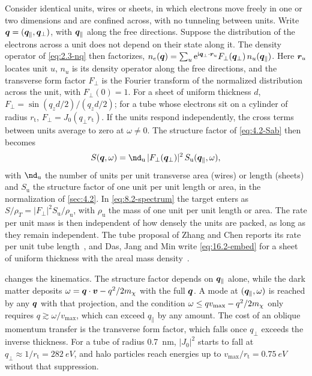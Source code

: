 Consider identical units, wires or sheets, in which electrons move freely in one or two dimensions and are confined across, with no tunneling between units. Write $\bm{q} = (\bm{q}_\parallel, \bm{q}_\perp)$, with $\bm{q}_\parallel$ along the free directions. Suppose the distribution of the electrons across a unit does not depend on their state along it. The density operator of \cref{eq:2.3-nq} then factorizes, $n_e(\bm{q}) = \sum_u \mathrm{e}^{\mathrm{i}\bm{q}_\perp\cdot\bm{r}_u}F_\perp(\bm{q}_\perp)\,n_u(\bm{q}_\parallel)$. Here $\bm{r}_u$ locates unit $u$, $n_u$ is its density operator along the free directions, and the transverse form factor $F_\perp$ is the Fourier transform of the normalized distribution across the unit, with $F_\perp(0) = 1$. For a sheet of uniform thickness $d$, $F_\perp = \sin(q_zd/2)/(q_zd/2)$; for a tube whose electrons sit on a cylinder of radius $r_{\mathrm{t}}$, $F_\perp = J_0(q_\perp r_{\mathrm{t}})$. If the units respond independently, the cross terms between units average to zero at $\omega \ne 0$. The structure factor of \cref{eq:4.2-Sab} then becomes
\begin{equation}
  S(\vect{q},\omega) = \nd_{\mathrm{u}}\,|F_\perp(\vect{q}_\perp)|^2\,S_{\mathrm{u}}(\vect{q}_\parallel,\omega) ,
  \label{eq:16.2-embed}
\end{equation}
with $\nd_{\mathrm{u}}$ the number of units per unit transverse area (wires) or length (sheets) and $S_{\mathrm{u}}$ the structure factor of one unit per unit length or area, in the normalization of \cref{sec:4.2}. In \cref{eq:8.2-spectrum} the target enters as $S/\rho_T = |F_\perp|^2S_{\mathrm{u}}/\rho_{\mathrm{u}}$, with $\rho_{\mathrm{u}}$ the mass of one unit per unit length or area. The rate per unit mass is then independent of how densely the units are packed, as long as they remain independent. The tube proposal of Zhang and Chen reports its rate per unit tube length~\cite[Eq.~(6)]{zhang2026luttinger}, and Das, Jang and Min write \cref{eq:16.2-embed} for a sheet of uniform thickness with the areal mass density~\cite[Eqs.~(13), (14)]{das2023sub}.

 changes the kinematics. The structure factor depends on $\bm{q}_\parallel$ alone, while the dark matter deposits $\omega = \bm{q}\cdot\bm{v} - q^2/2m_{\chi}$ with the full $\bm{q}$. A mode at $(\bm{q}_\parallel, \omega)$ is reached by any $\bm{q}$ with that projection, and the condition $\omega \le qv_{\mathrm{max}} - q^2/2m_{\chi}$ only requires $q \gtrsim \omega/v_{\mathrm{max}}$, which can exceed $q_\parallel$ by any amount. The cost of an oblique momentum transfer is the transverse form factor, which falls once $q_\perp$ exceeds the inverse thickness. For a tube of radius \SI{0.7}{nm}, $|J_0|^2$ starts to fall at $q_\perp \approx 1/r_{\mathrm{t}} = \SI{282}{eV}$, and halo particles reach energies up to $v_{\mathrm{max}}/r_{\mathrm{t}} = \SI{0.75}{eV}$ without that suppression.

